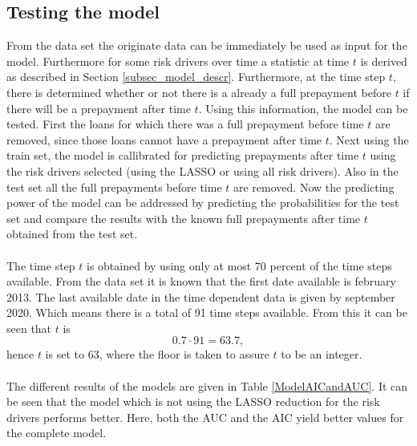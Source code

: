\subsection{Testing the model}
    From the data set the originate data can be immediately be used 
    as input for the model. Furthermore for some risk drivers over time 
    a statistic at time $t$ is derived as described in Section 
    \ref{subsec_model_descr}. Furthermore, at the time step $t$, 
    there is determined whether or not there is a already a full prepayment 
    before $t$ if there will be a prepayment after time $t$. Using this 
    information, the model can be tested. First the loans for 
    which there was a full prepayment before time $t$ are removed, 
    since those loans cannot have a prepayment after time $t$. 
    Next using the train set, the model is callibrated for 
    predicting prepayments after time $t$ using the risk drivers 
    selected (using the LASSO or using all risk drivers). 
    Also in the test set all the full prepayments before time 
    $t$ are removed. Now the predicting power of the model 
    can be addressed by predicting the probabilities for the test set 
    and compare the results with the known full prepayments after time 
    $t$ obtained from the test set.
    \\\\
    The time step $t$ is obtained by using only at most 70 percent 
    of the time steps available. From the data set it is known that 
    the first date available is february 2013. The last available
    date in the time dependent data is given by september 2020. 
    Which means there is a total of 91 time steps available. 
    From this it can be seen that $t$ is
    \begin{equation}
        0.7 \cdot 91 = 63.7,
    \end{equation}
    hence $t$ is set to 63, where the floor is taken to assure 
    $t$ to be an integer.
    \\\\
    The different results of the models are given in Table 
    \ref{ModelAICandAUC}. It can be seen that the model which 
    is not using the LASSO reduction for the risk drivers 
    performs better. Here, both the AUC and the AIC yield 
    better values for the complete model.
